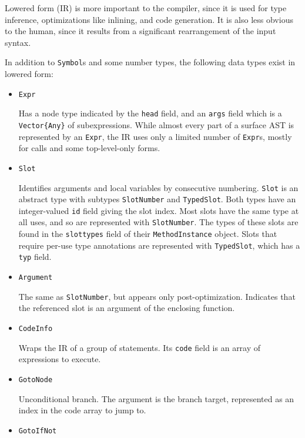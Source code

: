 Lowered form (IR) is more important to the compiler, since it is used for type inference, optimizations like inlining, and code generation. It is also less obvious to the human, since it results from a significant rearrangement of the input syntax.



In addition to \texttt{Symbol}s and some number types, the following data types exist in lowered form:



\begin{itemize}
\item \texttt{Expr}

Has a node type indicated by the \texttt{head} field, and an \texttt{args} field which is a \texttt{Vector\{Any\}} of subexpressions. While almost every part of a surface AST is represented by an \texttt{Expr}, the IR uses only a limited number of \texttt{Expr}s, mostly for calls and some top-level-only forms.


\item \texttt{Slot}

Identifies arguments and local variables by consecutive numbering. \texttt{Slot} is an abstract type with subtypes \texttt{SlotNumber} and \texttt{TypedSlot}. Both types have an integer-valued \texttt{id} field giving the slot index. Most slots have the same type at all uses, and so are represented with \texttt{SlotNumber}. The types of these slots are found in the \texttt{slottypes} field of their \texttt{MethodInstance} object. Slots that require per-use type annotations are represented with \texttt{TypedSlot}, which has a \texttt{typ} field.


\item \texttt{Argument}

The same as \texttt{SlotNumber}, but appears only post-optimization. Indicates that the referenced slot is an argument of the enclosing function.


\item \texttt{CodeInfo}

Wraps the IR of a group of statements. Its \texttt{code} field is an array of expressions to execute.


\item \texttt{GotoNode}

Unconditional branch. The argument is the branch target, represented as an index in the code array to jump to.


\item \texttt{GotoIfNot}


\end{itemize}
